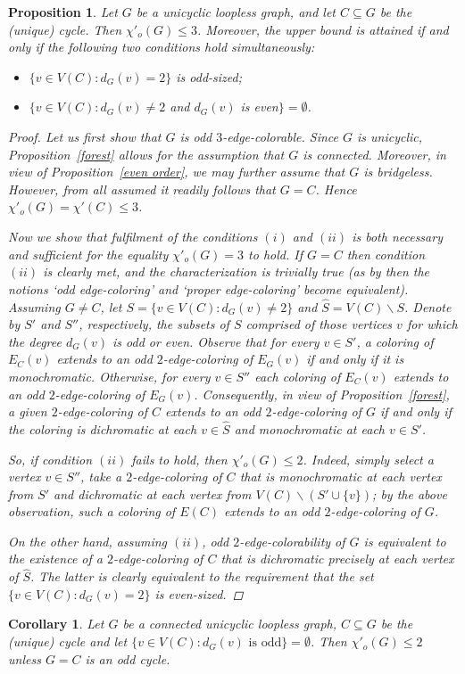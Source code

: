 \documentclass[a4paper,12pt]{article}
\newtheorem{corollary}[theorem]{Corollary}
\newtheorem{proposition}[theorem]{Proposition}
\numberwithin{equation}{section}
\begin{document}
\begin{proposition}
Let $G$ be a unicyclic loopless graph, and let $C\subseteq G$ be the (unique) cycle. Then $\chi'_o(G)\leq3$. Moreover, the upper bound is attained if and only if the following two conditions hold simultaneously:
\begin{itemize}
\item[$(i)$] $\{v\in V(C):d_G(v)=2\}$ is odd-sized;
\item[$(ii)$] $\{v\in V(C):d_G(v)\neq2$ and $d_G(v)$ is even$\}=\emptyset$.
\end{itemize}
\begin{proof}
Let us first show that $G$ is odd $3$-edge-colorable. Since $G$ is unicyclic, Proposition~\ref{forest} allows for the assumption that $G$ is connected. Moreover, in view of Proposition~\ref{even order}, we may further assume that $G$ is bridgeless. However, from all assumed it readily follows that $G=C$. Hence $\chi'_o(G)=\chi'(C)\leq3$.

Now we show that fulfilment of the conditions $(i)$ and $(ii)$ is both necessary and sufficient for the equality $\chi'_o(G)=3$ to hold.
If $G=C$ then condition $(ii)$ is clearly met, and the characterization is trivially true (as by then the notions `odd edge-coloring'  and `proper edge-coloring' become equivalent). Assuming $G\neq C$, let $S=\{v\in V(C):d_G(v)\neq2\}$ and $\widehat{S}=V(C)\backslash S$. Denote by $S'$ and $S''$, respectively, the subsets of $S$ comprised of those vertices $v$ for which the degree $d_G(v)$ is odd or even. Observe that for every $v\in S'$, a coloring of $E_C(v)$ extends to an odd $2$-edge-coloring of $E_G(v)$ if and only if it is monochromatic. Otherwise, for every $v\in S''$ each coloring of $E_C(v)$ extends to an odd $2$-edge-coloring of $E_G(v)$. Consequently, in view of Proposition~\ref{forest}, a given $2$-edge-coloring of $C$ extends to an odd $2$-edge-coloring of $G$ if and only if the coloring is dichromatic at each $v\in \widehat{S}$ and monochromatic at each $v\in S'$.

So, if condition $(ii)$ fails to hold, then $\chi'_o(G)\leq2$. Indeed, simply select a vertex $v\in S''$, take a $2$-edge-coloring of $C$ that is monochromatic at each vertex from $S'$ and dichromatic at each vertex from  $V(C)\backslash (S'\cup \{v\})$; by the above observation, such a coloring of $E(C)$ extends to an odd $2$-edge-coloring of $G$.

On the other hand, assuming $(ii)$, odd $2$-edge-colorability of $G$ is equivalent to the existence of a $2$-edge-coloring of $C$ that is dichromatic precisely at each vertex of $\widehat{S}$. The latter is clearly equivalent to the requirement that the set $\{v\in V(C):d_G(v)=2\}$ is even-sized.
\end{proof}
\end{proposition}
\begin{corollary}
    \label{unicycle}
Let $G$ be a connected unicyclic loopless graph, $C\subseteq G$ be the (unique) cycle and let $\{v\in V(C):d_G(v) \text{ is odd}\}=\emptyset$. Then $\chi'_o(G)\leq2$ unless $G=C$ is an odd cycle.
\end{corollary}
\end{document}
